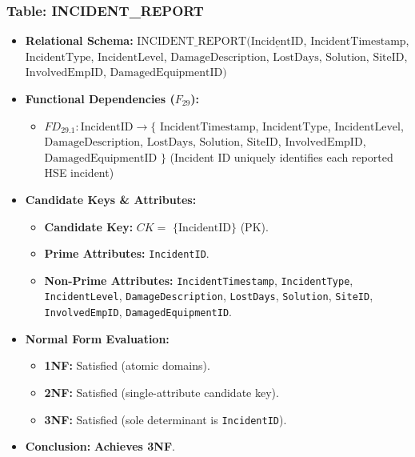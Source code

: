 \documentclass[a4paper,12pt]{report}
\providecommand{\tightlist}{%
  \setlength{\itemsep}{0pt}\setlength{\parskip}{0pt}}
\begin{document}
\subsubsection{\texorpdfstring{Table: INCIDENT\_\allowbreak{}REPORT}{Table: INCIDENTREPORT}}\label{table-incident_report}

\begin{itemize}
\item
  \textbf{Relational Schema:} \(\text{INCIDENT\_REPORT}(\underline{\text{IncidentID}}\), \(\text{IncidentTimestamp}\), \(\text{IncidentType}\), \(\text{IncidentLevel}\), \(\text{DamageDescription}\), \(\text{LostDays}\), \(\text{Solution}\), \(\text{SiteID}\), \(\text{InvolvedEmpID}\), \(\text{DamagedEquipmentID})\)
\item
  \textbf{Functional Dependencies (\(F_{29}\)):}

  \begin{itemize}
  \tightlist
  \item
    \(FD_{29.1}: \text{IncidentID} \rightarrow \{\) \(\text{IncidentTimestamp}\), \(\text{IncidentType}\), \(\text{IncidentLevel}\), \(\text{DamageDescription}\), \(\text{LostDays}\), \(\text{Solution}\), \(\text{SiteID}\), \(\text{InvolvedEmpID}\), \(\text{DamagedEquipmentID}\) \(\}\) (Incident ID uniquely identifies each reported HSE incident)
  \end{itemize}
\item
  \textbf{Candidate Keys \& Attributes:}

  \begin{itemize}
  \item
    \textbf{Candidate Key:} \(CK =\) \(\{\text{IncidentID}\}\) (PK).
  \item
    \textbf{Prime Attributes:} \texttt{IncidentID}.
  \item
    \textbf{Non-Prime Attributes:} \texttt{IncidentTimestamp}, \texttt{IncidentType}, \texttt{IncidentLevel}, \texttt{DamageDescription}, \texttt{LostDays}, \texttt{Solution}, \texttt{SiteID}, \texttt{InvolvedEmpID}, \texttt{DamagedEquipmentID}.
  \end{itemize}
\item
  \textbf{Normal Form Evaluation:}

  \begin{itemize}
  \item
    \textbf{1NF:} Satisfied (atomic domains).
  \item
    \textbf{2NF:} Satisfied (single-attribute candidate key).
  \item
    \textbf{3NF:} Satisfied (sole determinant is \texttt{IncidentID}).
  \end{itemize}
\item
  \textbf{Conclusion:} \textbf{Achieves 3NF}.
\end{itemize}
\end{document}

